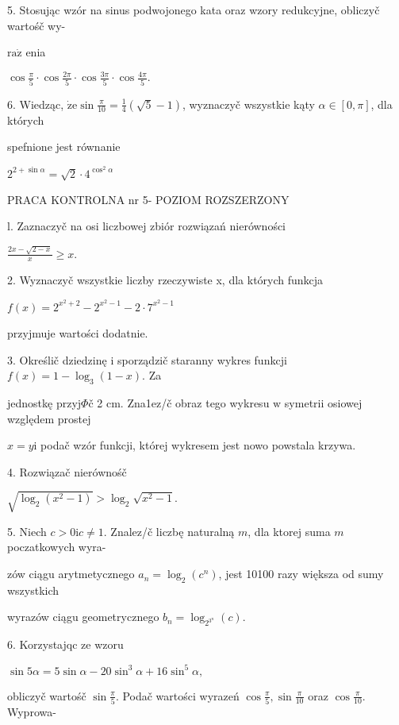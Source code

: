 \documentclass[a4paper,12pt]{article}
\begin{document}
5. Stosując wzór na sinus podwojonego kata oraz wzory redukcyjne, obliczyč wartośč wy-

$\mathrm{r}\mathrm{a}\dot{\mathrm{z}}$ enia

$\displaystyle \cos\frac{\pi}{5}\cdot\cos\frac{2\pi}{5}\cdot\cos\frac{3\pi}{5}\cdot\cos\frac{4\pi}{5}.$

6. Wiedząc, $\dot{\mathrm{z}}\mathrm{e} \displaystyle \sin\frac{\pi}{10} = \displaystyle \frac{1}{4}(\sqrt{5}-1)$, wyznaczyč wszystkie kąty $\alpha \in [0,\pi]$, dla których

spefnione jest równanie

$2^{2+\sin\alpha}=\sqrt{2}\cdot 4^{\cos^{2}\alpha}$





PRACA KONTROLNA nr 5- POZIOM ROZSZERZONY

l. Zaznaczyč na osi liczbowej zbiór rozwiązań nierówności

$\displaystyle \frac{2x-\sqrt{2-x}}{x}\geq x.$

2. Wyznaczyč wszystkie liczby rzeczywiste x, dla których funkcja

$f(x)=2^{x^{2}+2}-2^{x^{2}-1}-2\cdot 7^{x^{2}-1}$

przyjmuje wartości dodatnie.

3. Określič dziedzinę $\mathrm{i}$ sporządzič staranny wykres funkcji $f(x) = 1-\log_{3}(1-x)$. Za

jednostkę przyj$\Phi$č 2 cm. Zna1ez/č obraz tego wykresu $\mathrm{w}$ symetrii osiowej względem prostej

$x=y\mathrm{i}$ podač wzór funkcji, której wykresem jest nowo powstala krzywa.

4. Rozwiązač nierównośč

$\sqrt{\log_{2}(x^{2}-1)}>\log_{2}\sqrt{x^{2}-1}.$

5. Niech $c>0\mathrm{i}c\neq 1$. Znalez/č liczbę naturalną $m$, dla ktorej suma $m$ poczatkowych wyra-

zów ciągu arytmetycznego $a_{n}=\log_{2}(c^{n})$, jest 10100 razy większa od sumy wszystkich

wyrazów ciągu geometrycznego $b_{n}=\log_{2^{3^{n}}}(c).$

6. Korzystajqc ze wzoru

$\sin 5\alpha=5\sin\alpha-20\sin^{3}\alpha+16\sin^{5}\alpha,$

obliczyč wartośč $\displaystyle \sin\frac{\pi}{5}$. Podač wartości wyrazeń $\displaystyle \cos\frac{\pi}{5}, \displaystyle \sin\frac{\pi}{10}$ oraz $\displaystyle \cos\frac{\pi}{10}$. Wyprowa-
\end{document}
